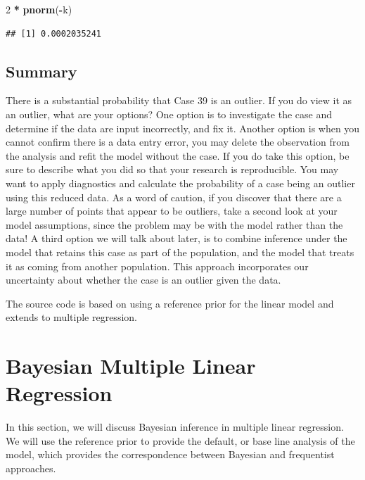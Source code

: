 \documentclass[]{book}
\newenvironment{Shaded}{\begin{snugshade}}{\end{snugshade}}
\newcommand{\KeywordTok}[1]{\textcolor[rgb]{0.13,0.29,0.53}{\textbf{#1}}}
\newcommand{\DecValTok}[1]{\textcolor[rgb]{0.00,0.00,0.81}{#1}}
\newcommand{\StringTok}[1]{\textcolor[rgb]{0.31,0.60,0.02}{#1}}
\newcommand{\OperatorTok}[1]{\textcolor[rgb]{0.81,0.36,0.00}{\textbf{#1}}}
\newcommand{\NormalTok}[1]{#1}
\theoremstyle{definition}
\theoremstyle{definition}
\theoremstyle{definition}
\theoremstyle{remark}
\begin{document}
\begin{Shaded}
\begin{Highlighting}[]
\DecValTok{2} \OperatorTok{*}\StringTok{ }\KeywordTok{pnorm}\NormalTok{(}\OperatorTok{-}\NormalTok{k)}
\end{Highlighting}
\end{Shaded}

\begin{verbatim}
## [1] 0.0002035241
\end{verbatim}

\subsection{Summary}\label{summary}

There is a substantial probability that Case 39 is an outlier. If you do
view it as an outlier, what are your options? One option is to
investigate the case and determine if the data are input incorrectly,
and fix it. Another option is when you cannot confirm there is a data
entry error, you may delete the observation from the analysis and refit
the model without the case. If you do take this option, be sure to
describe what you did so that your research is reproducible. You may
want to apply diagnostics and calculate the probability of a case being
an outlier using this reduced data. As a word of caution, if you
discover that there are a large number of points that appear to be
outliers, take a second look at your model assumptions, since the
problem may be with the model rather than the data! A third option we
will talk about later, is to combine inference under the model that
retains this case as part of the population, and the model that treats
it as coming from another population. This approach incorporates our
uncertainty about whether the case is an outlier given the data.

The source code is based on using a reference prior for the linear model
and extends to multiple regression.

\section{Bayesian Multiple Linear
Regression}\label{bayesian-multiple-linear-regression}

In this section, we will discuss Bayesian inference in multiple linear
regression. We will use the reference prior to provide the default, or
base line analysis of the model, which provides the correspondence
between Bayesian and frequentist approaches.
\end{document}
